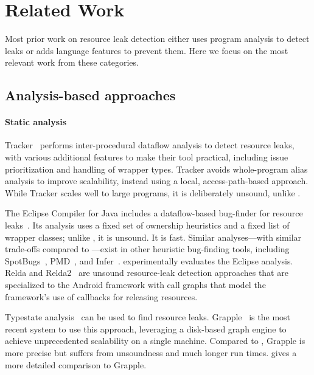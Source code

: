 \section{Related Work}
\label{sec:relatedwork}

Most prior work on resource leak detection either uses
program analysis to detect leaks or adds language features to prevent
them. Here we focus on the most relevant work from these categories.

\subsection{Analysis-based approaches}\label{sec:rw-analysis}


\paragraph{Static analysis}
Tracker~\cite{TorlakC10} performs inter-procedural dataflow analysis to detect
resource leaks, with various additional features to make their tool practical,
including issue prioritization and handling of wrapper types.  Tracker avoids
whole-program alias analysis to improve scalability, instead using a local,
access-path-based approach.  While Tracker scales well to large programs, it is
deliberately unsound, unlike \tool.

The Eclipse Compiler for Java includes a dataflow-based
bug-finder for resource leaks~\cite{ecj-resource-leak}. Its analysis
uses a fixed set of ownership heuristics and a fixed list of wrapper
classes; unlike \tool, it is unsound. It is fast.  Similar analyses---with similar trade-offs
compared to \tool---exist in other heuristic bug-finding tools,
including SpotBugs~\cite{spotbugs-resource-leak},
PMD~\cite{pmd-resource-leak}, and Infer~\cite{infer-resource-leak}.
 experimentally evaluates the Eclipse analysis.
Relda and Relda2~\cite{guo2013characterizing,wu2016relda2} are unsound
resource-leak detection approaches that are specialized to the Android framework
with call graphs that model the framework's use of callbacks for
releasing resources.

Typestate analysis~\cite{StromY86,FinkYDRG2008} can be used to
find resource leaks.  Grapple~\cite{zuo2019grapple} is the most recent system to
use this approach, leveraging a disk-based graph engine to achieve unprecedented
scalability on a single machine.  Compared to \tool, Grapple
is more precise but
suffers from unsoundness and much longer run times.
 gives a more detailed comparison to Grapple.

